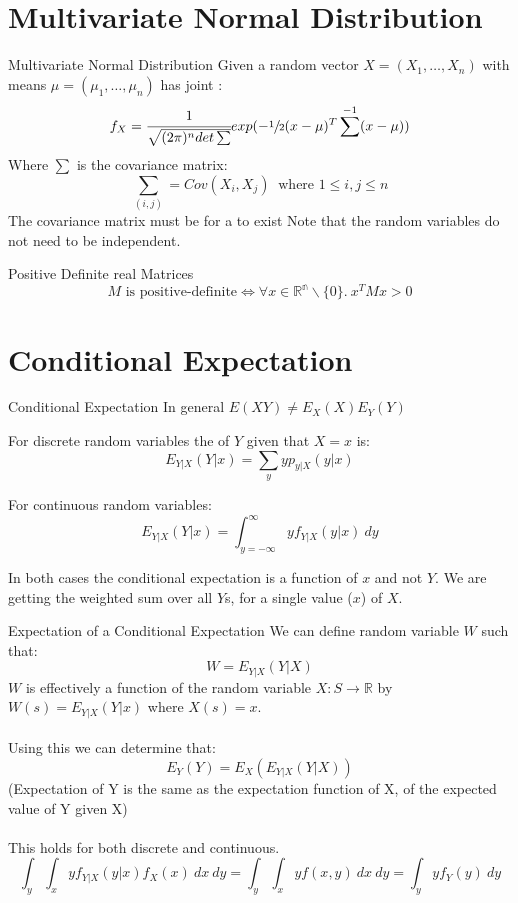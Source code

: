 \section{Multivariate Normal Distribution}
\begin{definitionbox}{Multivariate Normal Distribution}
	Given a random vector $X = (X_1, \dots, X_n)$ with means $\mu = (\mu_1, \dots, \mu_n)$ has joint :
	\[f_X = \cfrac{1}{\sqrt{(2 \pi)^n det \sum}}exp(-\sfrac{1}{2}(x - \mu)^T \sum^{-1}(x - \mu))\]
	Where $\sum$ is the covariance matrix:
	\[\sum_{(i,j)} = Cov(X_i, X_j) \ \text{ where } 1 \leq i, j \leq n\]
	The covariance matrix must be  for a  to exist
	Note that the random variables do not need to be independent.
\end{definitionbox}

\begin{sidenotebox}{Positive Definite real Matrices}
	\[M \text{ is positive-definite} \Leftrightarrow \forall x \in \mathbb{R^n} \backslash \{0\}. \ x^TMx > 0\]
\end{sidenotebox}

\section{Conditional Expectation}
\begin{definitionbox}{Conditional Expectation}
	In general $E(XY) \neq E_X(X)E_Y(Y)$

	For discrete random variables the  of $Y$ given that $X = x$ is:
	\[E_{Y|X}(Y|x) = \sum_y y p_{y|X}(y|x)\]

	For continuous random variables:
	\[E_{Y|X}(Y|x) = \int_{y = -\infty}^{\infty} y f_{Y|X}(y|x) \ dy\]

	In both cases the conditional expectation is a function of $x$ and not $Y$. We are getting the weighted sum over all $Y$s, for a single value ($x$) of $X$.
\end{definitionbox}

\begin{definitionbox}{Expectation of a Conditional Expectation}
	We can define random variable $W$ such that:
	\[W = E_{Y|X}(Y|X)\]
	$W$ is effectively a function of the random variable $X: S \to \mathbb{R}$ by $W(s) = E_{Y|X}(Y|x)$ where $X(s) = x$.
	\\
	\\ Using this we can determine that:
	\[E_Y(Y) = E_X(E_{Y|X}(Y|X))\]
	(Expectation of Y is the same as the expectation function of X, of the expected value of Y given X)
	\\
	\\ This holds for both discrete and continuous.
	\[\int_y \int_x yf_{Y|X}(y|x)f_X(x) \ dx \ dy = \int_y \int_x yf(x,y) \ dx \ dy = \int_y y f_Y(y) \ dy \]
\end{definitionbox}


